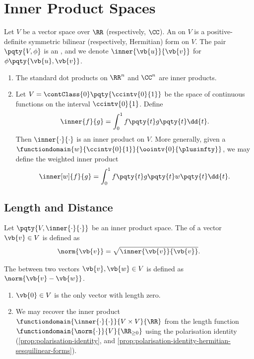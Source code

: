 \section{Inner Product Spaces}

\begin{definition}
    Let \(V\) be a vector space over \(\RR\) (respectively, \(\CC\)). An  on \(V\) is a positive-definite symmetric bilinear (respectively, Hermitian) form on \(V\). The pair \(\pqty{V, \phi}\) is an , and we denote \(\inner{\vb{u}}{\vb{v}}\) for \(\phi\pqty{\vb{u}, \vb{v}}\).
\end{definition}

\begin{examples}
    \begin{enumerate}[label=(\roman*)]
        \item The standard dot products on \(\RR^n\) and \(\CC^n\) are inner products.
        \item Let \(V = \contClass{0} \pqty{\ccintv{0}{1}}\) be the space of continuous functions on the interval \(\ccintv{0}{1}\). Define
        \[
            \inner{f}{g} = \int_{0}^{1} f\pqty{t} g\pqty{t} \dd{t}.
        \]
        Then \(\inner{\cdot}{\cdot}\) is an inner product on \(V\). More generally, given a  \(\functiondomain{w}{\ccintv{0}{1}}{\oointv{0}{\plusinfty}}\), we may define the weighted inner product
        \[
            \inner[w]{f}{g} = \int_{0}^{1} f\pqty{t} g\pqty{t} w\pqty{t} \dd{t}.
        \]
    \end{enumerate}
\end{examples}

\subsection{Length and Distance}

\begin{definition}
    Let \(\pqty{V, \inner{\cdot}{\cdot}}\) be an inner product space. The  of a vector \(\vb{v} \in V\) is defined as
    \[
        \norm{\vb{v}} = \sqrt{\inner{\vb{v}}{\vb{v}}}.
    \]

    The  between two vectors \(\vb{v}, \vb{w} \in V\) is defined as \(\norm{\vb{v} - \vb{w}}\).
\end{definition}

\begin{remarks}
    \begin{enumerate}[label=(\roman*)]
        \item \(\vb{0} \in V\) is the only vector with length zero.
        \item We may recover the inner product \(\functiondomain{\inner{\cdot}{\cdot}}{V \times V}{\RR}\) from the length function \(\functiondomain{\norm{\cdot}}{V}{\RR_{\geq 0}}\) using the polarisation identity (\autoref{prop:polarisation-identity}, and \autoref{prop:polarisation-identity-hermitian-sesquilinear-forms}).
    \end{enumerate}
\end{remarks}

